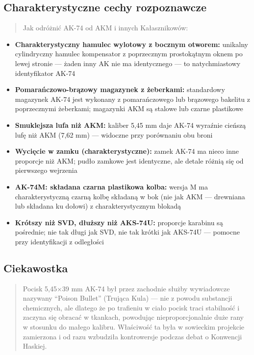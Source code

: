\documentclass[12pt,oneside]{book}
\providecommand{\tightlist}{%
  \setlength{\itemsep}{0pt}\setlength{\parskip}{0pt}}
\begin{document}
\subsection{Charakterystyczne cechy
rozpoznawcze}\label{charakterystyczne-cechy-rozpoznawcze-59}

\begin{quote}
Jak odróżnić AK-74 od AKM i innych Kałasznikowów:
\end{quote}

\begin{itemize}
\tightlist
\item
  \textbf{Charakterystyczny hamulec wylotowy z bocznym otworem:}
  unikalny cylindryczny hamulec kompensator z poprzecznym prostokątnym
  oknem po lewej stronie --- żaden inny AK nie ma identycznego --- to
  natychmiastowy identyfikator AK-74
\item
  \textbf{Pomarańczowo-brązowy magazynek z żeberkami:} standardowy
  magazynek AK-74 jest wykonany z pomarańczowego lub brązowego bakelitu
  z poprzecznymi żeberkami; magazynki AKM są stalowe lub czarne
  plastikowe
\item
  \textbf{Smuklejsza lufa niż AKM:} kaliber 5,45 mm daje AK-74 wyraźnie
  cieńszą lufę niż AKM (7,62 mm) --- widoczne przy porównaniu obu broni
\item
  \textbf{Wycięcie w zamku (charakterystyczne):} zamek AK-74 ma nieco
  inne proporcje niż AKM; pudło zamkowe jest identyczne, ale detale
  różnią się od pierwszego wejrzenia
\item
  \textbf{AK-74M: składana czarna plastikowa kolba:} wersja M ma
  charakterystyczną czarną kolbę składaną w bok (nie jak AKM ---
  drewniana lub składana ku dołowi) z charakterystycznym blokadą
\item
  \textbf{Krótszy niż SVD, dłuższy niż AKS-74U:} proporcje karabinu są
  pośrednie; nie tak długi jak SVD, nie tak krótki jak AKS-74U ---
  pomocne przy identyfikacji z odległości
\end{itemize}

\subsection{Ciekawostka}\label{ciekawostka-59}

\begin{quote}
Pocisk 5,45×39 mm AK-74 był przez zachodnie służby wywiadowcze nazywany
``Poison Bullet'' (Trująca Kula) --- nie z powodu substancji
chemicznych, ale dlatego że po trafieniu w ciało pocisk traci stabilność
i zaczyna się obracać w tkankach, powodując nieproporcjonalnie duże rany
w stosunku do małego kalibru. Właściwość ta była w sowieckim projekcie
zamierzona i od razu wzbudziła kontrowersje podczas debat o Konwencji
Haskiej.
\end{quote}
\end{document}
